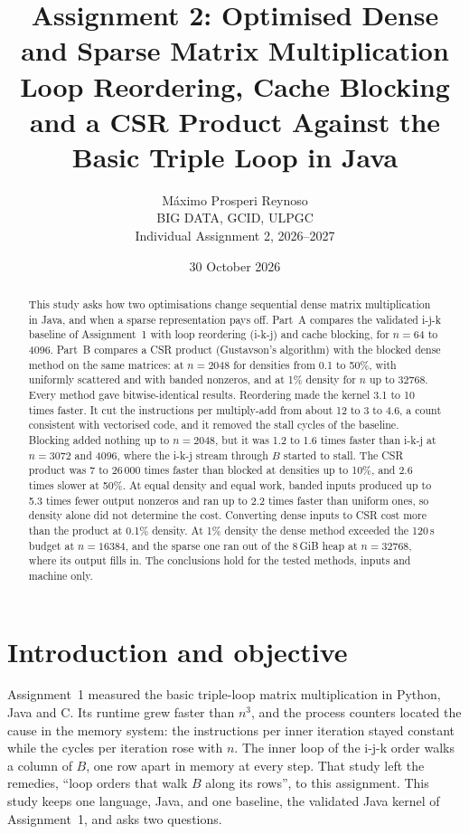 \documentclass[11pt,a4paper]{article}
\title{\textbf{Assignment 2: Optimised Dense and Sparse Matrix Multiplication}\\[4pt]
\large Loop Reordering, Cache Blocking and a CSR Product Against the Basic Triple Loop in Java}
\author{Máximo Prosperi Reynoso\\[2pt]
\small BIG DATA, GCID, ULPGC\\
\small Individual Assignment 2, 2026--2027\\[2pt]
\small \repourl}
\date{30 October 2026}
\begin{document}
\maketitle

\begin{abstract}
\noindent
This study asks how two optimisations change sequential dense matrix
multiplication in Java, and when a sparse representation pays off. Part~A
compares the validated i-j-k baseline of Assignment~1 with loop reordering
(i-k-j) and cache blocking, for $n=64$ to 4096. Part~B compares a CSR product
(Gustavson's algorithm) with the blocked dense method on the same matrices: at
$n=2048$ for densities from 0.1 to 50\%, with uniformly scattered and with
banded nonzeros, and at 1\% density for $n$ up to 32768. Every method gave
bitwise-identical results. Reordering made the kernel 3.1 to 10 times faster.
It cut the instructions per multiply-add from about 12 to 3 to 4.6, a count
consistent with vectorised code, and it removed the stall cycles of the
baseline. Blocking added nothing up to $n=2048$, but it was 1.2 to 1.6 times
faster than i-k-j at $n=3072$ and 4096, where the i-k-j stream through $B$
started to stall. The CSR product was 7 to 26\,000 times faster than blocked at
densities up to 10\%, and 2.6 times slower at 50\%. At equal density and equal
work, banded inputs produced up to 5.3 times fewer output nonzeros and ran up to
2.2 times faster than uniform ones, so density alone did not determine the
cost. Converting dense inputs to CSR cost more than the product at 0.1\%
density. At 1\% density the dense method exceeded the 120\,s budget at
$n=16384$, and the sparse one ran out of the 8\,GiB heap at $n=32768$, where
its output fills in. The conclusions hold for the tested methods, inputs and
machine only.
\end{abstract}

\section{Introduction and objective}

Assignment~1 measured the basic triple-loop matrix multiplication in Python, Java
and C. Its runtime grew faster than $n^3$, and the process counters located the
cause in the memory system: the instructions per inner iteration stayed constant
while the cycles per iteration rose with $n$. The inner loop of the i-j-k order
walks a column of $B$, one row apart in memory at every step. That study left the
remedies, ``loop orders that walk $B$ along its rows'', to this assignment. This
study keeps one language, Java, and one baseline, the validated Java kernel of
Assignment~1, and asks two questions.
\end{document}
